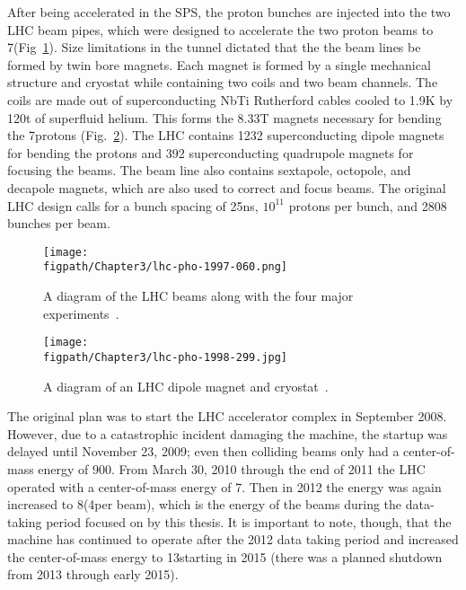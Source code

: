 \clearpage

After being accelerated in the SPS, the proton bunches are injected into the two LHC beam pipes, which were designed to accelerate the two proton beams to 7\TeV (Fig~\ref{fig:LHC_beams}).
Size limitations in the tunnel dictated that the the beam lines be formed by twin bore magnets.
Each magnet is formed by a single mechanical structure and cryostat while containing two coils and two beam channels.
The coils are made out of superconducting NbTi Rutherford cables cooled to 1.9\unit{K} by 120\unit{t} of superfluid helium.
This forms the 8.33\unit{T} magnets necessary for bending the 7\TeV protons (Fig.~\ref{fig:LHC_magnet}).
The LHC contains 1232 superconducting dipole magnets for bending the protons and 392 superconducting quadrupole magnets for focusing the beams.
The beam line also contains sextapole, octopole, and decapole magnets, which are also used to correct and focus beams.
The original LHC design calls for a bunch spacing of 25\unit{ns}, $10^{11}$ protons per bunch, and 2808 bunches per beam.

\begin{figure}[!hbt]
    \centering
    \texttt{[image: \\figpath/Chapter3/lhc-pho-1997-060.png]}
    \caption{A diagram of the LHC beams along with the four major experiments~\cite{Jean-Luc:841573}.}
    \label{fig:LHC_beams}
\end{figure}

\begin{figure}[!hbt]
    \centering
    \texttt{[image: \\figpath/Chapter3/lhc-pho-1998-299.jpg]}
    \caption{A diagram of an LHC dipole magnet and cryostat~\cite{Dailler:842253}.}
    \label{fig:LHC_magnet}
\end{figure}

The original plan was to start the LHC accelerator complex in September 2008.
However, due to a catastrophic incident damaging the machine, the startup was delayed until November 23, 2009; even then colliding beams only had a center-of-mass energy of 900\GeV.
From March 30, 2010 through the end of 2011 the LHC operated with a center-of-mass energy of 7\TeV.
Then in 2012 the energy was again increased to 8\TeV (4\TeV per beam), which is the energy of the beams during the data-taking period focused on by this thesis.
It is important to note, though, that the machine has continued to operate after the 2012 data taking period and increased the center-of-mass energy to 13\TeV starting in 2015 (there was a planned shutdown from 2013 through early 2015).

